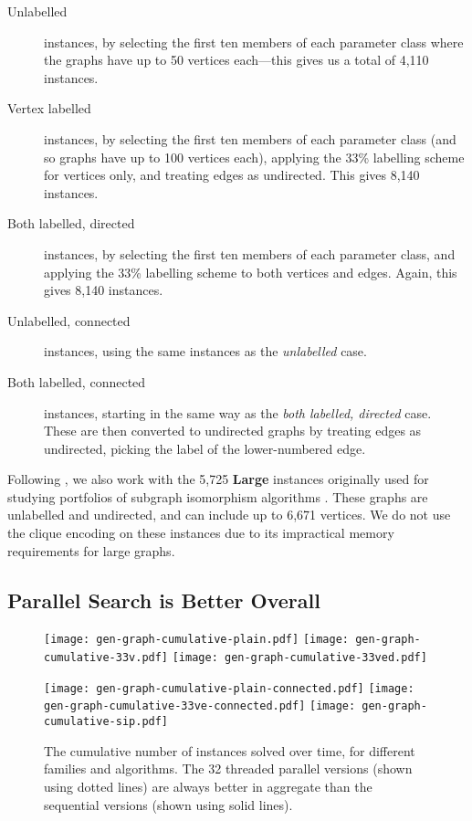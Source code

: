 \documentclass[sigconf]{acmart}
\begin{document}
\begin{description}
    \item[Unlabelled] instances, by selecting the first ten members of each parameter class where the
        graphs have up to 50 vertices each---this gives us a total of 4,110 instances.

    \item[Vertex labelled] instances, by selecting the first ten members of each parameter class
        (and so graphs have up to 100 vertices each), applying the 33\% labelling scheme for
        vertices only, and treating edges as undirected. This gives 8,140 instances.

    \item[Both labelled, directed] instances, by selecting the first ten members of each parameter
        class, and applying the 33\% labelling scheme to both vertices and edges. Again, this gives
        8,140 instances.

    \item[Unlabelled, connected] instances, using the same instances as the \emph{unlabelled} case.

    \item[Both labelled, connected] instances, starting in the same way as the \emph{both labelled,
        directed} case. These are then converted to undirected graphs by treating edges as
        undirected, picking the label of the lower-numbered edge.
\end{description}

\noindent
Following \citet{DBLP:conf/aaai/HoffmannMR17}, we also work with the 5,725 \textbf{Large} instances
originally used for studying portfolios of subgraph isomorphism algorithms
\citep{DBLP:conf/lion/KotthoffMS16}. These graphs are unlabelled and undirected, and can include up
to 6,671 vertices. We do not use the clique encoding on these instances due to its impractical
memory requirements for large graphs.

\subsection{Parallel Search is Better Overall}

\begin{figure*}[tb]
    \texttt{[image: gen-graph-cumulative-plain.pdf]}
    \hfill
    \texttt{[image: gen-graph-cumulative-33v.pdf]}
    \hfill
    \texttt{[image: gen-graph-cumulative-33ved.pdf]}

    \vspace*{1em}

    \texttt{[image: gen-graph-cumulative-plain-connected.pdf]}
    \hfill
    \texttt{[image: gen-graph-cumulative-33ve-connected.pdf]}
    \hfill
    \texttt{[image: gen-graph-cumulative-sip.pdf]}

    \caption{The cumulative number of instances solved over time, for different families and
    algorithms. The 32 threaded parallel versions (shown using dotted lines) are always better in
aggregate than the sequential versions (shown using solid lines).}\label{figure:cumulative}
\end{figure*}
\end{document}
